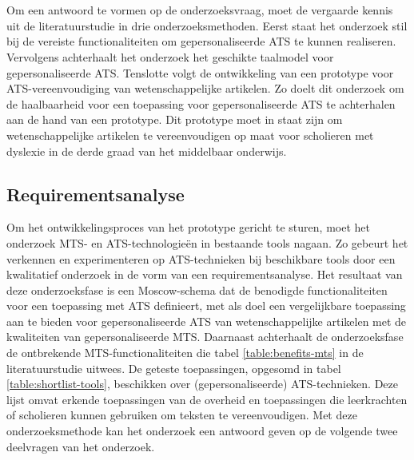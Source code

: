 
\chapter{}%
\label{ch:methodologie}


Om een antwoord te vormen op de onderzoeksvraag, moet de vergaarde kennis uit de literatuurstudie in drie onderzoeksmethoden. Eerst staat het onderzoek stil bij de vereiste functionaliteiten om gepersonaliseerde ATS te kunnen realiseren. Vervolgens achterhaalt het onderzoek het geschikte taalmodel voor gepersonaliseerde ATS. Tenslotte volgt de ontwikkeling van een prototype voor ATS-vereenvoudiging van wetenschappelijke artikelen. Zo doelt dit onderzoek om de haalbaarheid voor een toepassing voor gepersonaliseerde ATS te achterhalen aan de hand van een prototype. Dit prototype moet in staat zijn om wetenschappelijke artikelen te vereenvoudigen op maat voor scholieren met dyslexie in de derde graad van het middelbaar onderwijs.

\section{Requirementsanalyse}
\label{sec:requirementsanalyse}

Om het ontwikkelingsproces van het prototype gericht te sturen, moet het onderzoek MTS- en ATS-technologieën in bestaande tools nagaan. Zo gebeurt het verkennen en experimenteren op ATS-technieken bij beschikbare tools door een kwalitatief onderzoek in de vorm van een requirementsanalyse. Het resultaat van deze onderzoeksfase is een Moscow-schema dat de benodigde functionaliteiten voor een toepassing met ATS definieert, met als doel een vergelijkbare toepassing aan te bieden voor gepersonaliseerde ATS van wetenschappelijke artikelen met de kwaliteiten van gepersonaliseerde MTS. Daarnaast achterhaalt de onderzoeksfase de ontbrekende MTS-functionaliteiten die tabel \ref{table:benefits-mts} in de literatuurstudie uitwees. De geteste toepassingen, opgesomd in tabel \ref{table:shortlist-tools}, beschikken over (gepersonaliseerde) ATS-technieken. Deze lijst omvat erkende toepassingen van de overheid en toepassingen die leerkrachten of scholieren kunnen gebruiken om teksten te vereenvoudigen. Met deze onderzoeksmethode kan het onderzoek een antwoord geven op de volgende twee deelvragen van het onderzoek.

